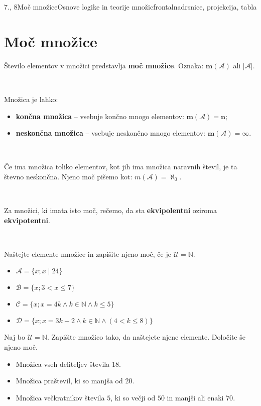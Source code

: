 \begin{priprava}{7., 8}{}{Moč množice}{Osnove logike in teorije množic}{frontalna}{drsnice, projekcija, tabla}


        
    \section{Moč množice}

    Število elementov v množici predstavlja \textbf{moč množice}.
    Oznaka: $\mathbf{m(\mathcal{A})}$ ali $\mathbf{|\mathcal{A}|}$.

    ~

    Množica je lahko:
    \begin{itemize}
        \item \textbf{končna množica} -- vsebuje končno mnogo elementov: $\mathbf{m(\mathcal{A})=n}$;
        \item \textbf{neskončna množica} -- vsebuje neskončno mnogo elementov: $\mathbf{m(\mathcal{A})=\infty}$.
    \end{itemize}

~

    Če ima množica toliko elementov, kot jih ima množica naravnih števil, je ta števno 
    neskončna.
    Njeno moč pišemo kot: $m(\mathcal{A})=\aleph_0$.

    ~

    Za množici, ki imata isto moč, rečemo, da sta \textbf{ekvipolentni} oziroma \textbf{ekvipotentni}.



~

\begin{naloga}
    Naštejte elemente množice in zapišite njeno moč, če je $\mathcal{U}=\mathbb{N}$.
    \begin{itemize}
        \item $\mathcal{A}=\{x; x\mid 24\}$
        \item $\mathcal{B}=\{x; 3<x\leq 7\}$
        \item $\mathcal{C}=\{x; x=4k\land k\in\mathbb{N}\land k\leq 5\}$
        \item $\mathcal{D}=\{x; x=3k+2\land k\in\mathbb{N}\land (4<k\leq 8)\}$
    \end{itemize}
\end{naloga}

\begin{naloga}
    Naj bo $\mathcal{U}=\mathbb{N}$. Zapišite množico tako, da naštejete njene elemente.
    Določite še njeno moč.
    \begin{itemize}
        \item Množica vseh deliteljev števila 18.
        \item Množica praštevil, ki so manjša od 20.
        \item Množica večkratnikov števila $5$, ki so večji od $50$ in manjši ali enaki $70$.
    \end{itemize}
\end{naloga}





\end{priprava}
